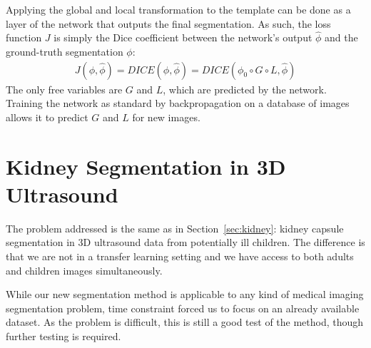 Applying the global and local transformation to the template can be done as a layer of the network that outputs the final segmentation. As such, the loss function $J$ is simply the Dice coefficient between the network's output $\hat{\phi}$ and the ground-truth segmentation $\phi$:
\begin{align}
    J \left( \phi, \hat{\phi} \right) = DICE \left( \phi, \hat{\phi} \right)%
                                      = DICE \left( \phi_0 \circ G \circ L, \hat{\phi} \right)%
\end{align}
The only free variables are $G$ and $L$, which are predicted by the network. Training the network as standard by backpropagation on a database of images allows it to predict $G$ and $L$ for new images. 

\section{Kidney Segmentation in 3D Ultrasound}
\label{sec:seg_data}

The problem addressed is the same as in Section~\ref{sec:kidney}: kidney capsule segmentation in 3D ultrasound data from potentially ill children. The difference is that we are not in a transfer learning setting and we have access to both adults and children images simultaneously.

While our new segmentation method is applicable to any kind of medical imaging segmentation problem, time constraint forced us to focus on an already available dataset. As the problem is difficult, this is still a good test of the method, though further testing is required. 


